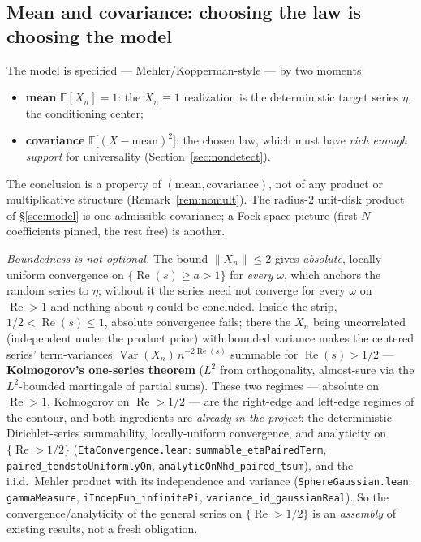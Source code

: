 \documentclass[11pt,a4paper]{article}
\theoremstyle{definition}
\newcommand{\Rea}{\operatorname{Re}}
\begin{document}
\subsection{Mean and covariance: choosing the law is choosing the model}\label{sec:general}

The model is specified --- Mehler/Kopperman-style --- by two moments:
\begin{itemize}
  \item \textbf{mean} \(\mathbb{E}[X_n]=1\): the \(X_n\equiv1\) realization is the
        deterministic target series \(\eta\), the conditioning center;
  \item \textbf{covariance} \(\mathbb{E}\bigl[(X-\text{mean})^2\bigr]\): the chosen law,
        which must have \emph{rich enough support} for universality (Section~\ref{sec:nondetect}).
\end{itemize}
The conclusion is a property of \((\text{mean},\text{covariance})\), not of any product or
multiplicative structure (Remark~\ref{rem:nomult}). The radius-\(2\) unit-disk product of
\S\ref{sec:model} is one admissible covariance; a Fock-space picture (first \(N\)
coefficients pinned, the rest free) is another.

\emph{Boundedness is not optional.} The bound \(\|X_n\|\le 2\) gives \emph{absolute},
locally uniform convergence on \(\{\Rea(s)\ge a>1\}\) for \emph{every} \(\omega\), which
anchors the random series to \(\eta\); without it the series need not converge for every
\(\omega\) on \(\Rea>1\) and nothing about \(\eta\) could be concluded. Inside the strip,
\(1/2<\Rea(s)\le1\), absolute convergence fails; there the \(X_n\) being uncorrelated
(independent under the product prior) with bounded variance makes the centered series'
term-variances \(\operatorname{Var}(X_n)\,n^{-2\Rea(s)}\) summable for \(\Rea(s)>1/2\) ---
\textbf{Kolmogorov's one-series theorem} (\(L^2\) from orthogonality, almost-sure via the
\(L^2\)-bounded martingale of partial sums). These two regimes --- absolute on \(\Rea>1\),
Kolmogorov on \(\Rea>1/2\) --- are the right-edge and left-edge regimes of the contour,
and both ingredients are \emph{already in the project}: the deterministic Dirichlet-series
summability, locally-uniform convergence, and analyticity on \(\{\Rea>1/2\}\)
(\texttt{EtaConvergence.lean}: \texttt{summable\_etaPairedTerm},
\texttt{paired\_tendstoUniformlyOn}, \texttt{analyticOnNhd\_paired\_tsum}), and the
i.i.d.\ Mehler product with its independence and variance (\texttt{SphereGaussian.lean}:
\texttt{gammaMeasure}, \texttt{iIndepFun\_infinitePi}, \texttt{variance\_id\_gaussianReal}).
So the convergence/analyticity of the general series on \(\{\Rea>1/2\}\) is an
\emph{assembly} of existing results, not a fresh obligation.
\end{document}
